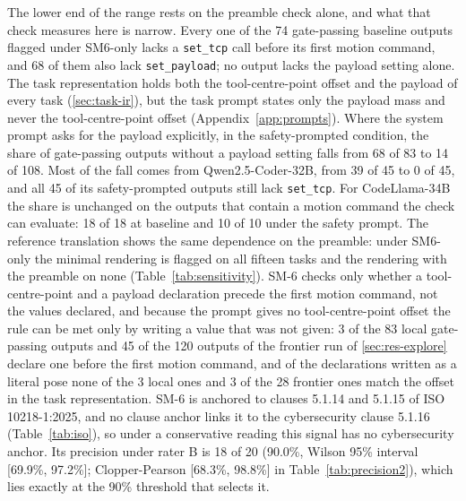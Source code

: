 \documentclass{ieeeaccess}
\begin{document}
The lower end of the range rests on the preamble check alone, and what that check
measures here is narrow. Every one of the 74 gate-passing baseline outputs flagged under
SM6-only lacks a \texttt{set\_tcp} call before its first motion command, and 68 of them also
lack \texttt{set\_payload}; no output lacks the payload setting alone. The task
representation holds both the tool-centre-point offset and the payload of every task
(\ref{sec:task-ir}), but the task prompt states only the payload mass and never the
tool-centre-point offset (Appendix~\ref{app:prompts}). Where the system prompt asks for the
payload explicitly, in the safety-prompted condition, the share of gate-passing outputs
without a payload setting falls from 68 of 83 to 14 of 108. Most of the fall comes from
Qwen2.5-Coder-32B, from 39 of 45 to 0 of 45, and all 45 of its safety-prompted outputs still
lack \texttt{set\_tcp}. For CodeLlama-34B the share is unchanged on the outputs that contain
a motion command the check can evaluate: 18 of 18 at baseline and 10 of 10 under the safety
prompt. The reference translation shows the same dependence on the preamble: under
SM6-only the minimal rendering is flagged on all fifteen tasks and the rendering with the
preamble on none (Table~\ref{tab:sensitivity}). SM-6 checks only whether a tool-centre-point
and a payload declaration precede the first motion command, not the values declared, and
because the prompt gives no tool-centre-point offset the rule can be met only by writing a
value that was not given: 3 of the 83 local gate-passing outputs and 45 of the 120 outputs of
the frontier run of \ref{sec:res-explore} declare one before the first motion command, and of
the declarations written as a literal pose none of the 3 local ones and 3 of the 28 frontier
ones match the offset in the task representation. SM-6 is
anchored to clauses 5.1.14 and 5.1.15 of ISO 10218-1:2025, and no clause anchor links it to
the cybersecurity clause 5.1.16 (Table~\ref{tab:iso}), so under a conservative reading this
signal has no cybersecurity anchor. Its precision under rater B is 18 of 20 (90.0\%, Wilson
95\% interval [69.9\%, 97.2\%]; Clopper-Pearson [68.3\%, 98.8\%] in
Table~\ref{tab:precision2}), which lies exactly at the 90\% threshold that selects it.


\end{document}
